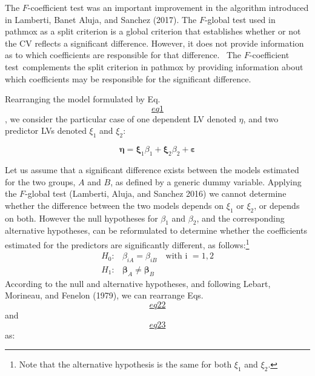 The \(F\)-coefficient test was an important improvement in the algorithm
introduced in Lamberti, Banet Aluja, and Sanchez (2017). The \(F\)-global test used in pathmox as a
split criterion is a global criterion that establishes whether or not
the CV reflects a significant difference. However, it does not provide
information as to which coefficients are responsible for that
difference. ~The \(F\)-coefficient test~complements the split criterion in
pathmox by providing information about which coefficients may be
responsible for the significant difference.

Rearranging the model formulated by Eq.
\protect\hyperlink{eq1}{\[eq1\]}, we consider the
particular case of one dependent LV denoted \(\eta\), and two predictor
LVs denoted \(\xi_1\) and \(\xi_2\):

\[\label{eq4}
\boldsymbol{\eta} = \boldsymbol{\xi}_1\beta_1 + \boldsymbol{\xi}_2\beta_2 + \boldsymbol{\varepsilon}\]

Let us assume that a significant difference exists between the models
estimated for the two groups, \(A\) and \(B\), as defined by a generic dummy
variable. Applying the \(F\)-global test (Lamberti, Aluja, and Sanchez 2016) we cannot determine
whether the difference between the two models depends on \(\xi_1\) or
\(\xi_2\), or depends on both. However the null hypotheses for \(\beta_1\)
and \(\beta_2\), and the corresponding alternative hypotheses, can be
reformulated to determine whether the coefficients estimated for the
predictors are significantly different, as follows:\footnote{Note that the alternative hypothesis is the same for both \(\xi_1\)
  and \(\xi_2\).}
\[\begin{aligned}
\label{eq5}
H_0: &\beta_{iA} =\beta_{iB}  \quad  \text{with i }= 1, 2\\
H_1: &\boldsymbol{\beta}_A \ne \boldsymbol{\beta}_B
\end{aligned}\] According to the null and alternative hypotheses, and
following Lebart, Morineau, and Fenelon (1979), we can rearrange Eqs.
\protect\hyperlink{eq22}{\[eq22\]} and
\protect\hyperlink{eq23}{\[eq23\]} as:

